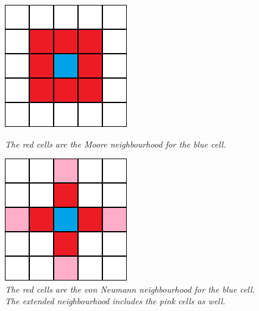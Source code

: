 \documentclass[a4paper, 11pt]{article} %
\begin{document}
\begin{figure}[ht]
	\centering
	\begin{minipage}[t]{0.45\textwidth}
    		\includegraphics[width=\textwidth]{moore}
		\caption{\textit{The red cells are the Moore neighbourhood for the blue cell.} \cite{wiki}}
		\label{fig:moore_neighbourhood}
	\end{minipage}
	\hfill
	\begin{minipage}[t]{0.45\textwidth}
		\includegraphics[width=\textwidth]{neumann}
		\caption{\textit{The red cells are the von Neumann neighbourhood for the blue cell. The extended neighbourhood includes the pink cells as well.} \cite{wiki}}
		\label{fig:neumann_neighbourhood}
	\end{minipage}
\end{figure}
\end{document}
